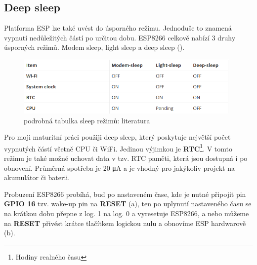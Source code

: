 \documentclass[a4paper, 12pt]{report}
\begin{document}
    \subsection{Deep sleep} \label{subsec:deep-sleep}
    Platforma ESP lze také uvést do úsporného režimu.
    Jednoduše to znamená vypnutí nedůležitých částí po určitou dobu.
    ESP8266 celkově nabízí 3 druhy úsporných režimů.
    Modem sleep, light sleep a deep sleep ().
    \begin{figure}[h!]
        \centering
        \includegraphics[width=11cm]{images/tabulka_sleep}
        \caption{podrobná tabulka sleep režimů: literatura~\cite{randomnerd}}
        \label{fig:sleep_tabulka}
    \end{figure}\par
    Pro moji maturitní práci použiji deep sleep, který poskytuje největší počet vypnutých částí včetně CPU či WiFi.
    Jedinou výjimkou je \textbf{RTC}\footnote{Hodiny realného času}.
    V tomto režimu je také možné uchovat data v tzv. RTC paměti, která jsou dostupná i po obnovení.
    Průměrná spotřeba je 20 \si{\micro A} a je vhodný pro jakýkoliv projekt na akumulátor či baterii. \par
    Probuzení ESP8266 probíhá, buď po nastaveném čase, kde je nutné připojit pin \textbf{GPIO 16} tzv. wake-up pin na \textbf{RESET} (a), ten po uplynutí nastaveného času se na krátkou dobu přepne z log. 1 na log. 0 a vyresetuje ESP8266, a nebo můžeme na \textbf{RESET}  přivést krátce tlačítkem logickou nulu a obnovíme ESP hardwarově (b).
\end{document}
